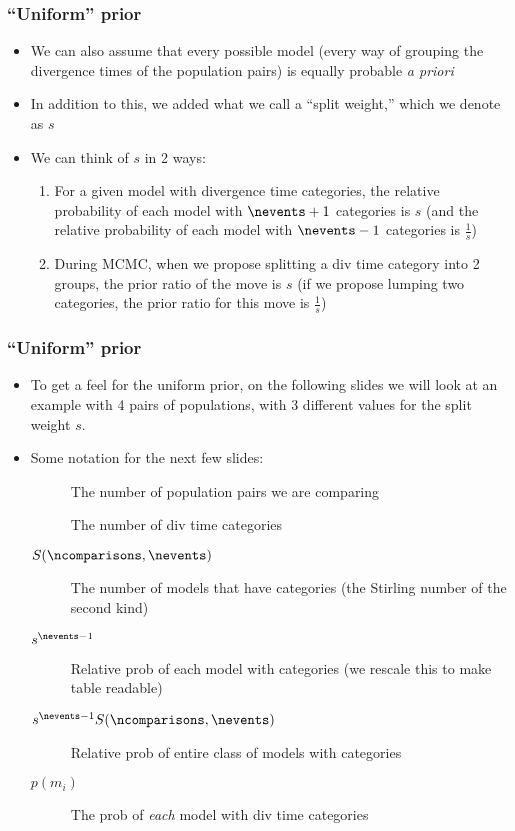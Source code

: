 \begin{frame}[t]
    \frametitle{``Uniform'' prior}
    \begin{itemize}
        \item We can also assume that every possible model (every way of
            grouping the divergence times of the population pairs) is equally
            probable \emph{a priori}
        \item In addition to this, we added what we call a ``split weight,''
            which we denote as $s$
        \item We can think of $s$ in 2 ways:
            \begin{enumerate}
                \item For a given model with \nevents{} divergence time categories,
                    the relative probability of each model with $\nevents+1$
                    categories is $s$ (and the relative probability of each model with $\nevents-1$ categories
                    is $\frac{1}{s}$)
                \item During MCMC, when we propose splitting a div time category into
                    2 groups, the prior ratio of the move is $s$ (if we propose lumping
                    two categories, the prior ratio for this move is $\frac{1}{s}$)
            \end{enumerate}
    \end{itemize}
\end{frame}

\begin{frame}[t]
    \frametitle{``Uniform'' prior}
    \begin{itemize}
        \item To get a feel for the uniform prior, on the following slides we
            will look at an example with 4 pairs of populations, with 3
            different values for the split weight $s$.
        \item Some notation for the next few slides:
            \begin{description}
                \item[\ncomparisons] The number of population pairs we are comparing
                \item[\nevents] The number of div time categories
                \item[$S(\ncomparisons,\nevents)$] The number of models that
                    have \nevents{} categories (the Stirling number of the second
                    kind)
                \item[$s^{\nevents-1}$] Relative prob of each model with \nevents{}
                    categories (we rescale this to make table readable)
                \item[$s^{\nevents-1}S(\ncomparisons,\nevents)$] Relative prob
                    of entire class of models with \nevents{} categories
                \item[$p(m_i)$] The prob of \emph{each} model 
                    with \nevents{} div time categories
            \end{description}
    \end{itemize}
\end{frame}

